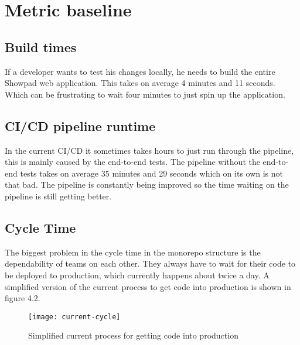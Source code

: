 \section{Metric baseline}
\subsection{Build times}
If a developer wants to test his changes locally, he needs to build the entire Showpad web application. This takes on average 4 minutes and 11 seconds. Which can be frustrating to wait four minutes to just spin up the application.

\subsection{CI/CD pipeline runtime}
In the current CI/CD it sometimes takes hours to just run through the pipeline, this is mainly caused by the end-to-end tests. The pipeline without the end-to-end tests takes on average 35 minutes and 29 seconds which on its own is not that bad. The pipeline is constantly being improved so the time waiting on the pipeline is still getting better.

\subsection{Cycle Time}
The biggest problem in the cycle time in the monorepo structure is the dependability of teams on each other. They always have to wait for their code to be deployed to production, which currently happens about twice a day. A simplified version of the current process to get code into production is shown in figure 4.2.

\begin{figure}[!h]
    \centering
    \texttt{[image: current-cycle]}
    \caption{Simplified current process for getting code into production}
\end{figure}
